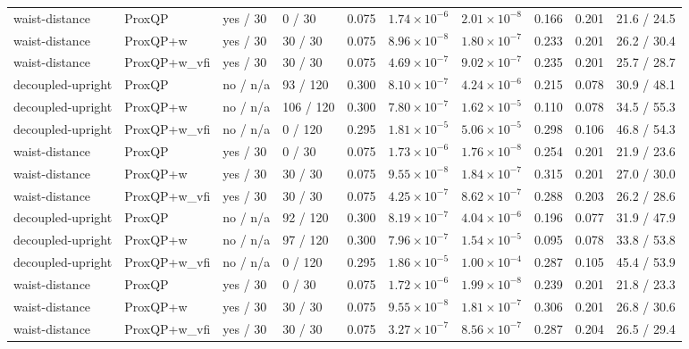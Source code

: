 \begin{tabular}{llllllllll}
waist-distance & ProxQP & yes / 30 & 0 / 30 & 0.075 & $1.74\times 10^{-6}$ & $2.01\times 10^{-8}$ & 0.166 & 0.201 & 21.6 / 24.5 \\
waist-distance & ProxQP+w & yes / 30 & 30 / 30 & 0.075 & $8.96\times 10^{-8}$ & $1.80\times 10^{-7}$ & 0.233 & 0.201 & 26.2 / 30.4 \\
waist-distance & ProxQP+w\_vfi & yes / 30 & 30 / 30 & 0.075 & $4.69\times 10^{-7}$ & $9.02\times 10^{-7}$ & 0.235 & 0.201 & 25.7 / 28.7 \\
decoupled-upright & ProxQP & no / n/a & 93 / 120 & 0.300 & $8.10\times 10^{-7}$ & $4.24\times 10^{-6}$ & 0.215 & 0.078 & 30.9 / 48.1 \\
decoupled-upright & ProxQP+w & no / n/a & 106 / 120 & 0.300 & $7.80\times 10^{-7}$ & $1.62\times 10^{-5}$ & 0.110 & 0.078 & 34.5 / 55.3 \\
decoupled-upright & ProxQP+w\_vfi & no / n/a & 0 / 120 & 0.295 & $1.81\times 10^{-5}$ & $5.06\times 10^{-5}$ & 0.298 & 0.106 & 46.8 / 54.3 \\
waist-distance & ProxQP & yes / 30 & 0 / 30 & 0.075 & $1.73\times 10^{-6}$ & $1.76\times 10^{-8}$ & 0.254 & 0.201 & 21.9 / 23.6 \\
waist-distance & ProxQP+w & yes / 30 & 30 / 30 & 0.075 & $9.55\times 10^{-8}$ & $1.84\times 10^{-7}$ & 0.315 & 0.201 & 27.0 / 30.0 \\
waist-distance & ProxQP+w\_vfi & yes / 30 & 30 / 30 & 0.075 & $4.25\times 10^{-7}$ & $8.62\times 10^{-7}$ & 0.288 & 0.203 & 26.2 / 28.6 \\
decoupled-upright & ProxQP & no / n/a & 92 / 120 & 0.300 & $8.19\times 10^{-7}$ & $4.04\times 10^{-6}$ & 0.196 & 0.077 & 31.9 / 47.9 \\
decoupled-upright & ProxQP+w & no / n/a & 97 / 120 & 0.300 & $7.96\times 10^{-7}$ & $1.54\times 10^{-5}$ & 0.095 & 0.078 & 33.8 / 53.8 \\
decoupled-upright & ProxQP+w\_vfi & no / n/a & 0 / 120 & 0.295 & $1.86\times 10^{-5}$ & $1.00\times 10^{-4}$ & 0.287 & 0.105 & 45.4 / 53.9 \\
waist-distance & ProxQP & yes / 30 & 0 / 30 & 0.075 & $1.72\times 10^{-6}$ & $1.99\times 10^{-8}$ & 0.239 & 0.201 & 21.8 / 23.3 \\
waist-distance & ProxQP+w & yes / 30 & 30 / 30 & 0.075 & $9.55\times 10^{-8}$ & $1.81\times 10^{-7}$ & 0.306 & 0.201 & 26.8 / 30.6 \\
waist-distance & ProxQP+w\_vfi & yes / 30 & 30 / 30 & 0.075 & $3.27\times 10^{-7}$ & $8.56\times 10^{-7}$ & 0.287 & 0.204 & 26.5 / 29.4 \\

\end{tabular}
